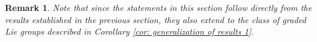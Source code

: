 \documentclass[pdflatex,sn-mathphys-num]{sn-jnl}
\theoremstyle{thmstyletwo}
\newtheorem{definition}{Definition}[section]
\theoremstyle{thmstyleone}
\newtheorem{theorem}[definition]{Theorem}
\theoremstyle{thmstyletwo}
\newtheorem{remark}[definition]{Remark}
\newcommand{\fancyg}{\mathfrak{g}}
\newcommand{\coadjoint}{\operatorname{Ad}^*}
\begin{document}
		
		
		
		\begin{remark}\label{rem: generalization of results 2}
			Note that since the statements in this section follow directly from the results established in the previous section, they also extend to the class of graded Lie groups described in Corollary \ref{cor: generalization of results 1}.
		\end{remark}
		
\end{document}
